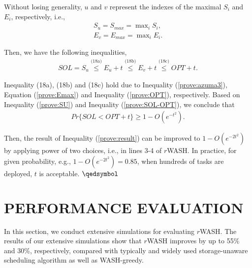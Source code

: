 \documentclass[conference]{IEEEtran}
\begin{document}
\vspace{-0.2cm}
Without losing generality, $u$ and $v$ represent the indexes of the maximal $S_i$ and $E_i$, respectively, i.e.,
\vspace{-0.2cm}
\begin{align}
	S_u = S_{max} = \max\nolimits_i S_i,\\
	E_v = E_{max} = \max\nolimits_i E_i.\label{prove:Emax}
\end{align}

\vspace{-0.2cm}
Then, we have the following inequalities,
\vspace{-0.2cm}
\begin{align}
SOL = S_u  
\overset{\text{(18a)}}{\leq} E_u+t
\overset{\text{(18b)}}{\leq} E_v+t
\overset{\text{(18c)}}{\leq} OPT+t.\label{prove:SOL-OPT}
\end{align}

Inequality (18a), (18b) and (18c) hold due to Inequality (\ref{prove:azuma3}), Equation (\ref{prove:Emax}) and Inequality (\ref{prove:OPT}), respectively.  Based on Inequality (\ref{prove:SU}) and Inequality (\ref{prove:SOL-OPT}), we conclude that
\vspace{-0.1cm}
\begin{align}
Pr\{SOL<OPT+t\}\geq 1 - O(e^{-t^2}).\label{prove:result}
\end{align}

\vspace{-0.2cm}

Then, the result of Inequality (\ref{prove:result}) can be improved to $1 - O(e^{-2t^2})$ by applying power of two choices, i.e., in lines 3-4 of $r$WASH. In practice, for given probability, e.g., $1 - O(e^{-2t^2}) = 0.85$, when hundreds of tasks are deployed, $t$ is acceptable. \hfill \;$\qedsymbol$

\section{PERFORMANCE EVALUATION}\label{PERFORMANCE_EVALUATION}
In this section, we conduct extensive simulations for evaluating $r$WASH. The results of our extensive simulations show that $r$WASH improves by up to 55\% and 30\%, respectively, compared with typically and widely used storage-unaware scheduling algorithm as well as WASH-greedy.
\end{document}
